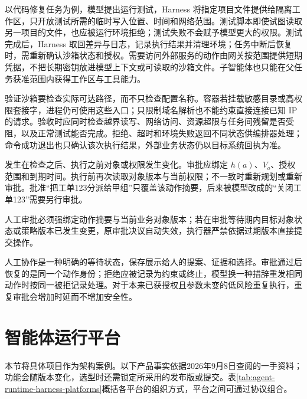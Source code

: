 \documentclass[../textbook.tex]{subfiles}
\begin{document}
以代码修复任务为例，模型提出运行测试，Harness 将指定项目文件提供给隔离工作区，只开放测试所需的临时写入位置、时间和网络范围。测试脚本即使试图读取另一项目的文件，也应被运行环境拒绝；测试失败不会赋予模型更大的权限。测试完成后，Harness 取回差异与日志，记录执行结果并清理环境；任务中断后恢复时，需重新确认沙箱状态和授权。需要访问外部服务的动作由网关按范围提供短期凭据，不把长期密钥放进模型上下文或可读取的沙箱文件。子智能体也只能在父任务获准范围内获得工作区与工具能力。

验证沙箱要检查实际可达路径，而不只检查配置名称。容器若挂载敏感目录或高权限套接字，进程仍可使用这些入口；只限制域名解析也不能约束直接连接已知 IP 的请求。验收时应同时检查越界读写、网络访问、资源超限与任务间残留是否受阻，以及正常测试能否完成。拒绝、超时和环境失败返回不同状态供编排器处理；命令成功退出也只确认该次执行结果，外部业务状态仍以目标系统回执为准。

发生在检查之后、执行之前对象或权限发生变化。审批应绑定 $h(a)$、$V_o$、授权范围和到期时间。执行前再次读取对象版本与当前权限；不一致时重新规划或重新审批。批准“把工单123分派给甲组”只覆盖该动作摘要，后来被模型改成的“关闭工单123”需要另行审批。

\begin{warning}
人工审批必须强绑定动作摘要与当前业务对象版本；若在审批等待期内目标对象状态或策略版本已发生变更，原审批决议自动失效，执行器严禁依据过期版本直接提交操作。
\end{warning}

人工协作是一种明确的等待状态，保存展示给人的提案、证据和选择。审批通过后恢复的是同一个动作身份；拒绝应被记录为约束或终止，模型换一种措辞重发相同动作时按同一被拒记录处理。对于本来已获授权且参数未变的低风险重复执行，重复审批会增加时延而不增加安全性。

\section{智能体运行平台}
\optional
\label{sec:harness-platforms}
本节将具体项目作为架构案例。以下产品事实依据2026年9月8日查阅的一手资料；功能会随版本变化，选型时还需锁定所采用的发布版或提交。表\ref{tab:agent-runtime-harness-platforms}概括各平台的组织方式，平台之间可通过协议组合。
\end{document}
